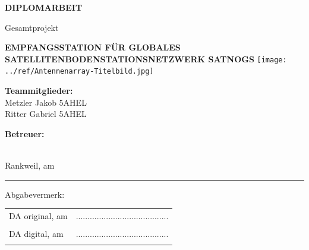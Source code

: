 \documentclass[hidelinks,12pt,a4paper,twoside]{report}
\begin{document}
	\begin{center}
		\textbf {\huge {\uppercase {Diplomarbeit}}}
		\par \large {Gesamtprojekt}
		\par \textbf {\huge {\uppercase {Empfangsstation für globales Satellitenbodenstationsnetzwerk SatNOGS}}}
		\vspace{0.3cm}
		\linebreak
		\texttt{[image: ../ref/Antennenarray-Titelbild.jpg]}
	\end{center}
	
	\vfill %
	
	
	\begin{minipage}[t] {0.4\textwidth}
		\textbf{Teammitglieder:} \\
		Metzler Jakob \textbar{} 5AHEL \\
		Ritter Gabriel \textbar{} 5AHEL \\
	\end{minipage}
	\begin{minipage}[t] {0.4\textwidth}
		\textbf{Betreuer:} \\		
		\supervisor \\
	\end{minipage}
	
	\par Rankweil, am \PrintDate \\		
	
	\noindent\rule{\textwidth}{0.4pt}
	Abgabevermerk:
	\linebreak
	
	\begin{tabular}{p{7cm}C{6cm}}
		\hspace{1cm} DA original, am \PrintDate & ........................................ \\ 
		& \supervisor \\ [2.5em]
		
		\hspace{1cm} DA digital, am \PrintDate & ........................................ \\ 
		& \supervisor \\
	\end{tabular}
	
	
	\newpage
	
	\SecAuth{\emplLastA, \emplLastB} %
	
	\fancyfoot[LE,RO]{\thepage}
	\renewcommand{\footrulewidth}{0.4pt} %
	
\end{document}
